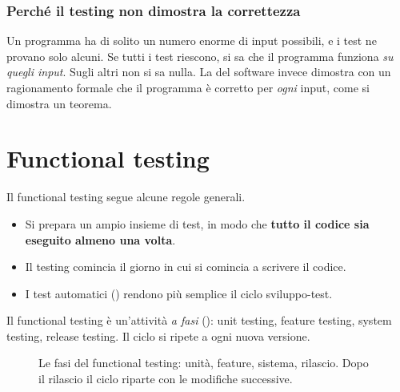 \subsubsection{Perché il testing non dimostra la correttezza\aggiunta}
Un programma ha di solito un numero enorme di input possibili, e i test ne provano solo alcuni. Se tutti i test
riescono, si sa che il programma funziona \emph{su quegli input}. Sugli altri non si sa nulla. La
 del software invece dimostra con un ragionamento formale che il programma è corretto per
\emph{ogni} input, come si dimostra un teorema.

\section{Functional testing}
\label{sec:test-funzionale}

Il functional testing segue alcune regole generali.
\begin{itemize}
  \item Si prepara un ampio insieme di test, in modo che \textbf{tutto il codice sia eseguito almeno una volta}.
  \item Il testing comincia il giorno in cui si comincia a scrivere il codice.
  \item I test automatici () rendono più semplice il ciclo sviluppo-test.
\end{itemize}

Il functional testing è un'attività \emph{a fasi} (): unit testing, feature testing, system
testing, release testing. Il ciclo si ripete a ogni nuova versione.

\begin{figure}[ht]
\centering
{}
\caption{Le fasi del functional testing: unità, feature, sistema, rilascio. Dopo il rilascio il ciclo riparte con le
modifiche successive.}
\label{fig:test-fasi}
\end{figure}

